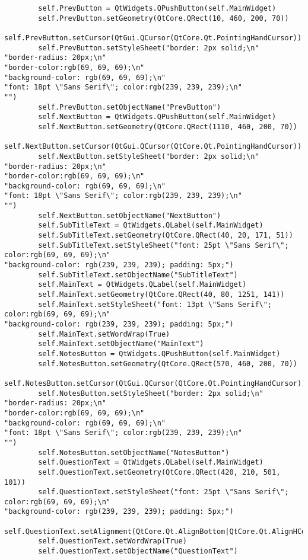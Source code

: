 \documentclass{article}
\begin{document}
\begin{lstlisting}
        self.PrevButton = QtWidgets.QPushButton(self.MainWidget)
        self.PrevButton.setGeometry(QtCore.QRect(10, 460, 200, 70))
        self.PrevButton.setCursor(QtGui.QCursor(QtCore.Qt.PointingHandCursor))
        self.PrevButton.setStyleSheet("border: 2px solid;\n"
"border-radius: 20px;\n"
"border-color:rgb(69, 69, 69);\n"
"background-color: rgb(69, 69, 69);\n"
"font: 18pt \"Sans Serif\"; color:rgb(239, 239, 239);\n"
"")
        self.PrevButton.setObjectName("PrevButton")
        self.NextButton = QtWidgets.QPushButton(self.MainWidget)
        self.NextButton.setGeometry(QtCore.QRect(1110, 460, 200, 70))
        self.NextButton.setCursor(QtGui.QCursor(QtCore.Qt.PointingHandCursor))
        self.NextButton.setStyleSheet("border: 2px solid;\n"
"border-radius: 20px;\n"
"border-color:rgb(69, 69, 69);\n"
"background-color: rgb(69, 69, 69);\n"
"font: 18pt \"Sans Serif\"; color:rgb(239, 239, 239);\n"
"")
        self.NextButton.setObjectName("NextButton")
        self.SubTitleText = QtWidgets.QLabel(self.MainWidget)
        self.SubTitleText.setGeometry(QtCore.QRect(40, 20, 171, 51))
        self.SubTitleText.setStyleSheet("font: 25pt \"Sans Serif\"; color:rgb(69, 69, 69);\n"
"background-color: rgb(239, 239, 239); padding: 5px;")
        self.SubTitleText.setObjectName("SubTitleText")
        self.MainText = QtWidgets.QLabel(self.MainWidget)
        self.MainText.setGeometry(QtCore.QRect(40, 80, 1251, 141))
        self.MainText.setStyleSheet("font: 13pt \"Sans Serif\"; color:rgb(69, 69, 69);\n"
"background-color: rgb(239, 239, 239); padding: 5px;")
        self.MainText.setWordWrap(True)
        self.MainText.setObjectName("MainText")
        self.NotesButton = QtWidgets.QPushButton(self.MainWidget)
        self.NotesButton.setGeometry(QtCore.QRect(570, 460, 200, 70))
        self.NotesButton.setCursor(QtGui.QCursor(QtCore.Qt.PointingHandCursor))
        self.NotesButton.setStyleSheet("border: 2px solid;\n"
"border-radius: 20px;\n"
"border-color:rgb(69, 69, 69);\n"
"background-color: rgb(69, 69, 69);\n"
"font: 18pt \"Sans Serif\"; color:rgb(239, 239, 239);\n"
"")
        self.NotesButton.setObjectName("NotesButton")
        self.QuestionText = QtWidgets.QLabel(self.MainWidget)
        self.QuestionText.setGeometry(QtCore.QRect(420, 210, 501, 101))
        self.QuestionText.setStyleSheet("font: 25pt \"Sans Serif\"; color:rgb(69, 69, 69);\n"
"background-color: rgb(239, 239, 239); padding: 5px;")
        self.QuestionText.setAlignment(QtCore.Qt.AlignBottom|QtCore.Qt.AlignHCenter)
        self.QuestionText.setWordWrap(True)
        self.QuestionText.setObjectName("QuestionText")

\end{lstlisting}
\end{document}
